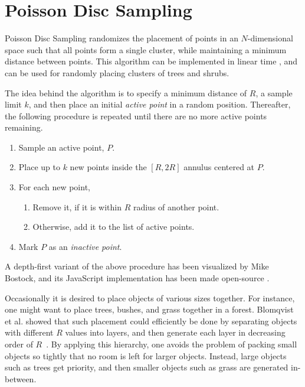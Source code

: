 \section{Poisson Disc Sampling}

Poisson Disc Sampling randomizes the placement of points in an $N$-dimensional space such that all points form a single cluster, while maintaining a minimum distance between points.
This algorithm can be implemented in linear time \cite{poisson_fast}, and can be used for randomly placing clusters of trees and shrubs.


The idea behind the algorithm is to specify a minimum distance of $R$, a sample limit $k$, and then place an initial \textit{active point} in a random position.
Thereafter, the following procedure is repeated until there are no more active points remaining.
\vspace{-0.5cm} %
\begin{enumerate}
  \item Sample an active point, $P$.
  \item Place up to $k$ new points inside the $[R, 2R]$ annulus centered at $P$.
  \item For each new point,
  \begin{enumerate}
    \item Remove it, if it is within $R$ radius of another point.
    \item Otherwise, add it to the list of active points.
  \end{enumerate}
  \item Mark $P$ as an \textit{inactive point}.
\end{enumerate}

A depth-first variant of the above procedure has been visualized by Mike Bostock, and its JavaScript implementation has been made open-source \cite{poisson_demo}.

Occasionally it is desired to place objects of various sizes together.
For instance, one might want to place trees, bushes, and grass together in a forest.
Blomqvist et al. showed that such placement could efficiently be done by separating objects with different $R$ values into layers, and then generate each layer in decreasing order of $R$~\cite[p.32]{ba_landscape}.
By applying this hierarchy, one avoids the problem of packing small objects so tightly that no room is left for larger objects.
Instead, large objects such as trees get priority, and then smaller objects such as grass are generated in-between.